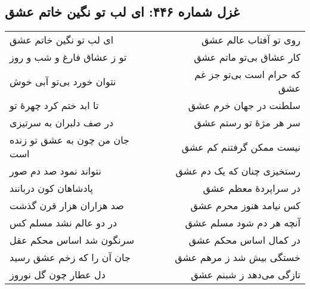 \begin{center}
\section*{غزل شماره ۴۴۶: ای لب تو نگین خاتم عشق}
\label{sec:446}
\begin{longtable}{l p{0.5cm} r}
ای لب تو نگین خاتم عشق
&&
روی تو آفتاب عالم عشق
\\
تو ز عشاق فارغ و شب و روز
&&
کار عشاق بی‌تو ماتم عشق
\\
نتوان خورد بی‌تو آبی خوش
&&
که حرام است بی‌تو جز غم عشق
\\
تا ابد ختم کرد چهرهٔ تو
&&
سلطنت در جهان خرم عشق
\\
در صف دلبران به سرتیزی
&&
سر هر مژهٔ تو رستم عشق
\\
جان من چون به عشق تو زنده است
&&
نیست ممکن گرفتنم کم عشق
\\
نتواند نمود صد دم صور
&&
رستخیزی چنان که یک دم عشق
\\
پادشاهان کون دربانند
&&
در سراپردهٔ معظم عشق
\\
صد هزاران هزار قرن گذشت
&&
کس نیامد هنوز محرم عشق
\\
در دو عالم نشد مسلم کس
&&
آنچه هر دم شود مسلم عشق
\\
سرنگون شد اساس محکم عقل
&&
در کمال اساس محکم عشق
\\
جان آن را که زخم عشق رسید
&&
خستگی بیش شد ز مرهم عشق
\\
دل عطار چون گل نوروز
&&
تازگی می‌دهد ز شبنم عشق
\\
\end{longtable}
\end{center}

